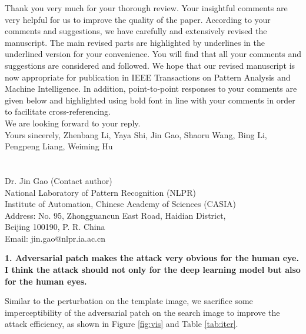 \documentclass[12pt]{article}
\begin{document}
Thank you very much for your thorough review. Your insightful comments are very helpful for us to improve the quality of the paper. According to your comments and suggestions, we have carefully and extensively revised the manuscript. The main revised parts are highlighted by underlines in the underlined version for your convenience. You will find that all your comments and suggestions are considered and followed. We hope that our revised manuscript is now appropriate for publication in IEEE Transactions on Pattern Analysis and Machine Intelligence.
In addition, point-to-point responses to your comments are given below and highlighted using bold font in line with your comments in order to facilitate cross-referencing.\\[10pt]
\indent We are looking forward to your reply.\\[10pt]
\noindent Yours sincerely,
\noindent Zhenbang Li, Yaya Shi, Jin Gao, Shaoru Wang, Bing Li, Pengpeng Liang, Weiming Hu
\\
\\
\\
\noindent Dr. Jin Gao (Contact author)\\
\noindent National Laboratory of Pattern Recognition (NLPR)\\
\noindent Institute of Automation, Chinese Academy of Sciences (CASIA)\\
\noindent Address: No. 95, Zhongguancun East Road, Haidian District,\\
\noindent Beijing 100190, P. R. China\\
\noindent Email: jin.gao@nlpr.ia.ac.cn

\newpage
\textbf{1. Adversarial patch makes the attack very obvious for the human eye. I think the attack should not only for the deep learning model but also for the human eyes.}

Similar to the perturbation on the template image, we sacrifice some imperceptibility of the adversarial patch on the search image to improve the attack efficiency, as shown in Figure \ref{fig:vis} and Table \ref{tab:iter}.
\end{document}
